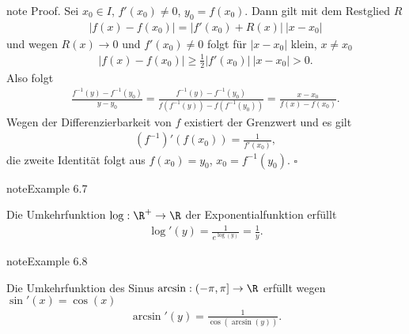 \documentclass[letterpaper,10pt,english]{jupyterBook}
\begin{document}
\begin{sphinxadmonition}{note}
Proof. Sei \(x_0 \in I\), \(f'(x_0) \neq 0\), \(y_0 =f(x_0)\). Dann gilt mit dem Restglied \(R\)
\begin{equation*}
\begin{split} \vert f(x) - f(x_0) \vert = \vert f'(x_0) + R(x) \vert ~\vert x- x_0\vert\end{split}
\end{equation*}
und wegen \(R(x) \rightarrow 0\) und \(f'(x_0) \neq 0\) folgt für \(|x-x_0|\) klein, \(x \neq x_0\)
\begin{equation*}
\begin{split} |f(x) - f(x_0)| \geq \frac{1}2 |f'(x_0)| ~|x-x_0| > 0.\end{split}
\end{equation*}
Also folgt
\begin{equation*}
\begin{split}\frac{f^{-1}(y) - f^{-1}(y_0)}{y-y_0} =  \frac{f^{-1}(y) - f^{-1}(y_0)}{f(f^{-1}(y)) - f(f^{-1}(y_0))} =\frac{x -x_0}{f(x) - f(x_0)}.\end{split}
\end{equation*}
Wegen der Differenzierbarkeit von \(f\) existiert der Grenzwert und es gilt
\begin{equation*}
\begin{split} (f^{-1})'(f(x_0)) = \frac{1}{f'(x_0)},\end{split}
\end{equation*}
die zweite Identität folgt aus \(f(x_0)=y_0\), \(x_0 = f^{-1}(y_0)\). \(\square\)
\end{sphinxadmonition}
\label{differential/kombfkt:example-6}
\begin{sphinxadmonition}{note}{Example 6.7}



Die Umkehrfunktion \(\log: \R^+ \rightarrow \R\) der Exponentialfunktion erfüllt
\begin{equation*}
\begin{split} \log'(y)  = \frac{1}{e^{\log(y)}} = \frac{1}y.\end{split}
\end{equation*}\end{sphinxadmonition}
\label{differential/kombfkt:example-7}
\begin{sphinxadmonition}{note}{Example 6.8}



Die Umkehrfunktion des Sinus \(\arcsin: (-\pi,\pi] \rightarrow \R\)   erfüllt wegen \(\sin'(x) = \cos(x)\)
\begin{equation*}
\begin{split} \arcsin'(y)  = \frac{1}{ \cos(\arcsin(y))} .\end{split}
\end{equation*}\end{sphinxadmonition}
\end{document}
